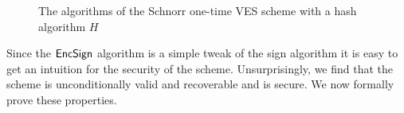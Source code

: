 \begin{figure}[h]
\begin{mdframed}
\begin{pchstack}[center]
    \pchspace
    \end{pchstack}
    \begin{pchstack}[center]
    \pchspace
    \pchspace
    \pchspace
    \end{pchstack}
    \end{mdframed}
    \caption{The algorithms of the Schnorr one-time VES scheme with a hash algorithm $H$}
    \label{fig:schnorr-ves}
\end{figure}

Since the $\textsf{EncSign}$ algorithm is a simple tweak of the sign algorithm it is easy to get an intuition for the security of the scheme.
Unsurprisingly, we find that the scheme is unconditionally valid and recoverable and is \EUFCMAVES secure.
We now formally prove these properties.

